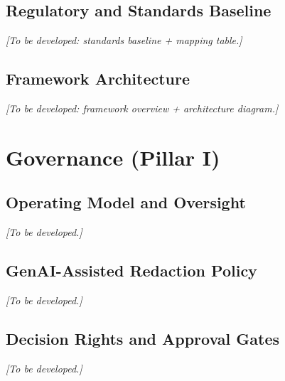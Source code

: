 \documentclass[12pt,a4paper]{article}
\begin{document}
\subsection{Regulatory and Standards Baseline}
\textit{[To be developed: standards baseline + mapping table.]}

\subsection{Framework Architecture}
\textit{[To be developed: framework overview + architecture diagram.]}

\section{Governance (Pillar I)}

\subsection{Operating Model and Oversight}
\textit{[To be developed.]}

\subsection{GenAI-Assisted Redaction Policy}
\textit{[To be developed.]}

\subsection{Decision Rights and Approval Gates}
\textit{[To be developed.]}
\end{document}
